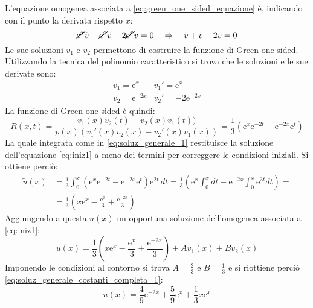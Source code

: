 \documentclass[]{scrartcl}
\begin{document}
L'equazione omogenea associata a \eqref{eq:green_one_sided_equazione} è, indicando con il punto la derivata rispetto $ x $:
\[ \cancel{\mathrm{e}^x}\dot{v} + \cancel{\mathrm{e}^x}\ddot{v}-2\cancel{\mathrm{e}^x}v = 0 \quad \Rightarrow \quad \ddot{v} + \dot{v} - 2v = 0 \]
Le sue soluzioni $ v_1 $ e $ v_2 $ permettono di costruire la funzione di Green one-sided. Utilizzando la tecnica del polinomio caratteristico si trova che le soluzioni e le sue derivate sono:
\[
\begin{array}{ll}
 v_1 = \mathrm{e}^x & v_1' = \mathrm{e}^x \\
 v_2 = \mathrm{e}^{-2x} & v_2' = -2\mathrm{e}^{-2x}
\end{array}
\]
La funzione di Green one-sided è quindi:
\[	R(x,t) = \frac{v_1(x)v_2(t) - v_2(x)v_1(t))}{p(x)\left(v_1'(x)v_2(x) - v_2'(x)v_1(x)\right)} = \frac{1}{3}\left(\mathrm{e}^x\mathrm{e}^{-2t} - \mathrm{e}^{-2x}\mathrm{e}^t\right)	\]
La quale integrata come in \eqref{eq:soluz_generale_1} restituisce la soluzione dell'equazione \eqref{eq:iniz1} a meno dei termini per correggere le condizioni iniziali. Si ottiene perciò:
\[
\begin{split} 
\tilde{u}(x) & = \frac{1}{3} \int_0^x \left( \mathrm{e}^x \mathrm{e}^{-2t} - \mathrm{e}^{-2x} \mathrm{e}^t \right)\mathrm{e}^{2t}\,dt = \frac{1}{3} \left( \mathrm{e}^{x} \int_0^xdt - \mathrm{e}^{-2x}\int_{0}^{x}\mathrm{e}^{3t}dt\right) = \\ & = \frac{1}{3} \left(x\mathrm{e}^x - \frac{\mathrm{e}^x}{3} + \frac{\mathrm{e}^{-2x}}{3}\right)
\end{split}
\]
Aggiungendo a questa $ u(x) $ un opportuna soluzione dell'omogenea associata a \eqref{eq:iniz1}:
\[ u(x) = \frac{1}{3} \left(x\mathrm{e}^x - \frac{\mathrm{e}^x}{3} + \frac{\mathrm{e}^{-2x}}{3}\right) + Av_1(x) + Bv_2(x) \]
Imponendo le condizioni al contorno si trova $ A=\frac{2}{3} $ e $ B=\frac{1}{3} $ e si riottiene perciò \eqref{eq:soluz_generale_costanti_completa_1}:
\begin{equation}
u(x) = \frac{4}{9} \mathrm{e}^{-2x}	+ \frac{5}{9} \mathrm{e}^{x} + \frac{1}{3}x\mathrm{e}^x
\end{equation}
\end{document}
